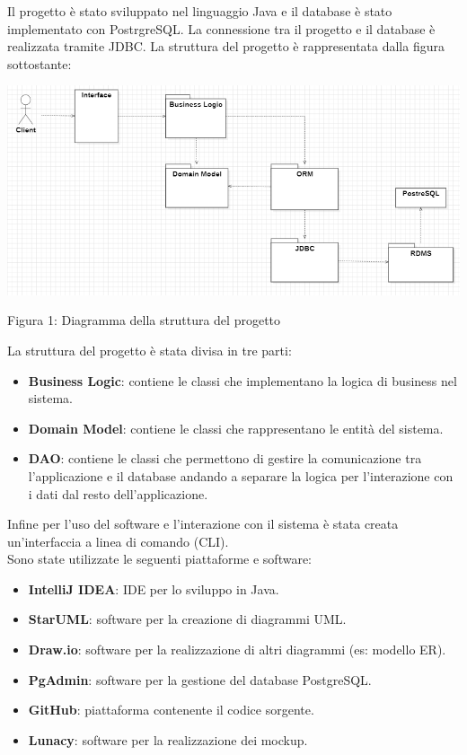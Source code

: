 \documentclass[10pt]{article}
\begin{document}
Il progetto è stato sviluppato nel linguaggio Java e il database è stato implementato con PostrgreSQL. La connessione tra il progetto e il database è realizzata tramite JDBC. La struttura del progetto è rappresentata dalla figura sottostante: 
\begin{center}
\includegraphics[scale=0.5]{Sp/StrutturaProgetto}
\par\medskip
Figura 1: Diagramma della struttura del progetto
\par\medskip
\end{center}
La struttura del progetto è stata divisa in tre parti:
\begin{itemize}
	\item \textbf{Business Logic}: contiene le classi che implementano la logica di business nel sistema.
	\item \textbf{Domain Model}: contiene le classi che rappresentano le entità del sistema.
	\item \textbf{DAO}: contiene le classi che permettono di gestire la comunicazione tra l'applicazione e il database andando a separare la logica per l'interazione con i dati dal resto dell'applicazione.
\end{itemize}
Infine per l'uso del software e l'interazione con il sistema è stata creata un'interfaccia a linea di comando (CLI).\\
Sono state utilizzate le seguenti piattaforme e software:
\begin{itemize}
\item \textbf{IntelliJ IDEA}: IDE per lo sviluppo in Java.
\item \textbf{StarUML}: software per la creazione di diagrammi UML.
\item \textbf{Draw.io}: software per la realizzazione di altri diagrammi (es: modello ER).
\item \textbf{PgAdmin}: software per la gestione del database PostgreSQL.
\item \textbf{GitHub}: piattaforma contenente il codice sorgente.
\item \textbf{Lunacy}: software per la realizzazione dei mockup.
\end{itemize}
\end{document}
